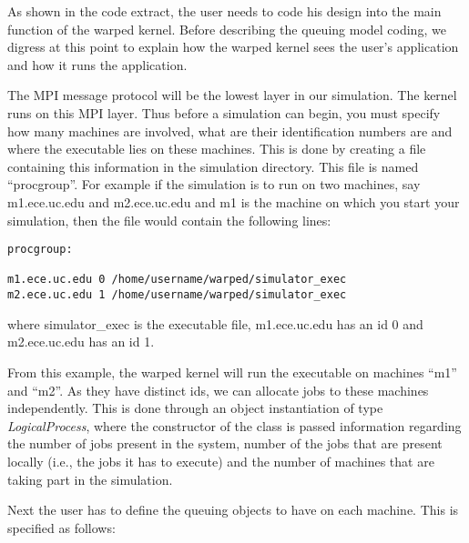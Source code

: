 \documentclass[11pt]{report}
\begin{document}
As shown in the code extract, the user needs to code his design into the
main function of the warped kernel.  Before describing the queuing model
coding, we digress at this point to explain how the warped kernel sees
the user's application and how it runs the application.

The MPI message protocol will be the lowest layer in our simulation.
The kernel runs on this MPI layer.  Thus before a simulation can begin,
you must specify how many machines are involved, what are their
identification numbers are and where the executable lies on these
machines.  This is done by creating a file containing this information
in the simulation directory. This file is named ``procgroup''.  For
example if the simulation is to run on two machines, say m1.ece.uc.edu and
m2.ece.uc.edu and m1 is the machine on which you start your simulation,
then the file would contain the following lines:

\begin{verbatim}
procgroup:

m1.ece.uc.edu 0 /home/username/warped/simulator_exec 
m2.ece.uc.edu 1 /home/username/warped/simulator_exec
\end{verbatim}

where simulator\_exec is the executable file, m1.ece.uc.edu has an id 0
and m2.ece.uc.edu has an id 1.

From this example, the warped kernel will run the executable on machines
``m1'' and ``m2''.  As they have distinct ids, we can allocate jobs to
these machines independently.  This is done through an object
instantiation of type {\it LogicalProcess}, where the constructor of
the class is passed information regarding the number of jobs present in
the system, number of the jobs that are present locally (i.e., the jobs
it has to execute) and the number of machines that are taking part in
the simulation.

Next the user has to define the queuing objects to have on each machine.
This is specified as follows:
\end{document}
